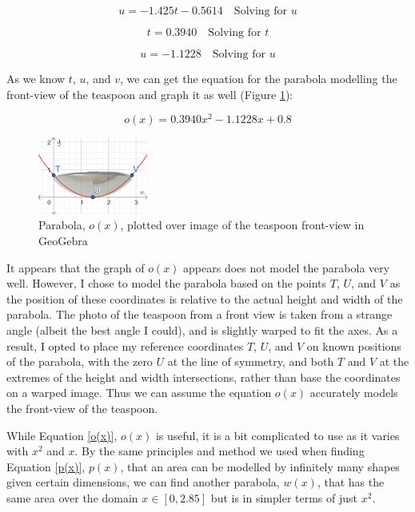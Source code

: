 \documentclass[12pt]{article}
\begin{document}
\begin{equation}\label{solve.u}
    \boxed{u = -1.425t -0.5614}  \quad \text{Solving for } u
\end{equation}

\begin{equation}\label{solve.t}
    \boxed{t = 0.3940}  \quad \text{Solving for } t
\end{equation}

\begin{equation}\label{solve.u2}
    \boxed{u = -1.1228}  \quad \text{Solving for } u
\end{equation}

As we know $t$, $u$, and $v$, we can get the equation for the parabola modelling the front-view of the teaspoon and graph it as well (Figure \ref{fig:fv tsp model}):

\begin{equation}\label{o(x)}
    \boxed{o(x)= 0.3940x^2 -1.1228 x +0.8}
\end{equation}

\begin{figure}[h]
    \centering
        \includegraphics[width=0.32\textwidth]{images/fv.tspcurve.jpg}
        \caption{Parabola, $o(x)$, plotted over image of the teaspoon front-view in GeoGebra}
    \label{fig:fv tsp model}
\end{figure}

It appears that the graph of $o(x)$ appears does not model the parabola very well. However, I chose to model the parabola based on the points $T$, $U$, and $V$ as the position of these coordinates is relative to the actual height and width of the parabola. The photo of the teaspoon from a front view is taken from a strange angle (albeit the best angle I could), and is slightly warped to fit the axes. As a result, I opted to place my reference coordinates $T$, $U$, and $V$ on known positions of the parabola, with the zero $U$ at the line of symmetry, and both $T$ and $V$ at the extremes of the height and width intersections, rather than base the coordinates on a warped image. Thus we can assume the equation $o(x)$ accurately models the front-view of the teaspoon.

While Equation \ref{o(x)}, $o(x)$ is useful, it is a bit complicated to use as it varies with $x^2$ and $x$. By the same principles and method we used when finding Equation \ref{p(x)}, $p(x)$, that an area can be modelled by infinitely many shapes given certain dimensions, we can find another parabola, $w(x)$, that has the same area over the domain $x \in [0,2.85]$ but is in simpler terms of just $x^2$. 
\end{document}
